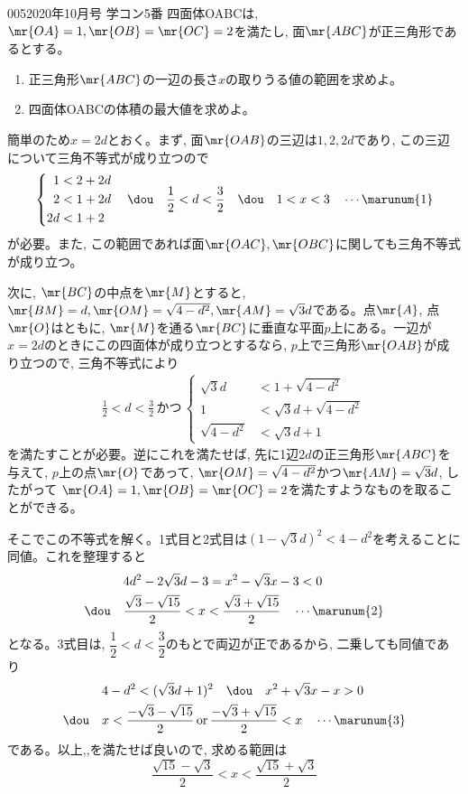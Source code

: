 \begin{prob}{005}{}{2020年10月号 学コン5番}
 四面体OABCは, $\mr{OA}=1, \mr{OB}=\mr{OC}=2$を満たし, 面$\mr{ABC}$が正三角形であるとする。
 \begin{enumerate}
  \item 正三角形$\mr{ABC}$の一辺の長さ$x$の取りうる値の範囲を求めよ。
  \item 四面体OABCの体積の最大値を求めよ。
 \end{enumerate}
\end{prob}

簡単のため$x=2d$とおく。まず, 面$\mr{OAB}$の三辺は$1,2,2d$であり, この三辺について三角不等式が成り立つので 
\begin{align*}
 \left\{
 \begin{aligned}
  1&<2+2d \\
  2&<1+2d \\
  2d&<1+2
 \end{aligned}
 \right. \quad\dou\quad \frac{1}{2}<d<\frac{3}{2} \quad\dou\quad 1<x<3 \quad \cdots\marunum{1}
\end{align*}
が必要。また, この範囲であれば面$\mr{OAC}, \mr{OBC}$に関しても三角不等式が成り立つ。

次に, $\mr{BC}$の中点を$\mr{M}$とすると, $\mr{BM}=d, \mr{OM}=\sqrt{4-d^{2}}, \mr{AM}=\sqrt{3}d$である。点$\mr{A}$, 点$\mr{O}$はともに, $\mr{M}$を通る$\mr{BC}$に垂直な平面$p$上にある。一辺が$x=2d$のときにこの四面体が成り立つとするなら, $p$上で三角形$\mr{OAB}$が成り立つので, 三角不等式により
\begin{align*}
 \frac{1}{2}<d<\frac{3}{2} \,\text{かつ}\,\left\{
 \begin{aligned}
  \sqrt{3}d&<1+\sqrt{4-d^2} \\
  1&<\sqrt{3}d+\sqrt{4-d^2} \\
  \sqrt{4-d^2}&<\sqrt{3}d+1
 \end{aligned}
 \right.
\end{align*}
を満たすことが必要。逆にこれを満たせば, 先に1辺$2d$の正三角形$\mr{ABC}$を与えて, $p$上の点$\mr{O}$であって, $\mr{OM}=\sqrt{4-d^{2}}$かつ$\mr{AM}=\sqrt{3}d$, したがって $\mr{OA}=1, \mr{OB}=\mr{OC}=2$を満たすようなものを取ることができる。

そこでこの不等式を解く。1式目と2式目は$(1-\sqrt{3}d)^{2} < 4-d^{2}$を考えることに同値。これを整理すると
\begin{align*}
 & 4d^2-2\sqrt{3}d-3=x^2-\sqrt{3}x-3 <0 \\
 \dou\quad &\frac{\sqrt{3}-\sqrt{15}}{2}<x<\frac{\sqrt{3}+\sqrt{15}}{2} \quad\cdots\marunum{2}
\end{align*}
となる。3式目は, $\dfrac{1}{2}< d < \dfrac{3}{2}$のもとで両辺が正であるから, 二乗しても同値であり
\begin{align*}
 & 4-d^2<(\sqrt{3}d+1)^2 \quad\dou\quad x^2+\sqrt{3}x-x>0 \\
 \dou\quad & x<\frac{-\sqrt{3}-\sqrt{15}}{2} \,\text{or}\, \frac{-\sqrt{3}+\sqrt{15}}{2} < x \quad\cdots\marunum{3}
\end{align*}
である。以上,,を満たせば良いので, 求める範囲は
\[ \dfrac{\sqrt{15}-\sqrt{3}}{2} < x  < \dfrac{\sqrt{15}+\sqrt{3}}{2} \]

